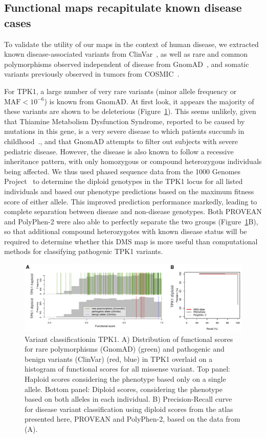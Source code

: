 \subsection{Functional maps recapitulate known disease cases}

To validate the utility of our maps in the context of human disease, we extracted known disease-associated variants from ClinVar~\cite{landrum_clinvar:_2016}, as well as rare and common polymorphisms observed independent of disease from GnomAD~\cite{lek_analysis_2016}, and somatic variants previously observed in tumors from COSMIC~\cite{forbes_cosmic:_2001}. 

For TPK1, a large number of very rare variants (minor allele frequency or $\text{MAF} < 10^{-6}$) is known from GnomAD. At first look, it appears the majority of these variants are shown to be deleterious (Figure~\ref{fig:tpk1_diploid}). This seems unlikely, given that Thiamine Metabolism Dysfunction Syndrome, reported to be caused by mutations in this gene, is a very severe disease to which patients succumb in childhood~\cite{mayr_thiamine_2011}., and that GnomAD attempts to filter out subjects with severe pediatric disease. However, the disease is also known to follow a recessive inheritance pattern, with only homozygous or compound heterozygous individuals being affected. We thus used phased sequence data from the 1000 Genomes Project~\cite{the_1000_genomes_project_consortium_global_2015} to determine the diploid genotypes in the TPK1 locus for all listed individuals and based our phenotype predictions based on the maximum fitness score of either allele. This improved prediction performance markedly, leading to complete separation between disease and non-disease genotypes. Both PROVEAN and PolyPhen-2 were also able to perfectly separate the two groups (Figure~\ref{fig:tpk1_diploid}B), so that additional compound heterozygotes with known disease status will be required to determine whether this DMS map is more useful than computational methods for classifying pathogenic TPK1 variants. 

\begin{figure}[h!]
	\centering
	\includegraphics[width=\textwidth]{img/diploid.pdf}
	\caption{Variant classificationin TPK1. A) Distribution of functional scores for rare polymorphisms (GnomAD) (green) and pathogenic and benign variants (ClinVar) (red, blue) in TPK1 overlaid on a histogram of functional scores for all missense variant. Top panel: Haploid scores considering the phenotype based only on a single allele. Bottom panel: Diploid scores, considering the phenotype based on both alleles in each individual. B) Precision-Recall curve for disease variant classification using diploid scores from the atlas presented here, PROVEAN and PolyPhen-2, based on the data from (A).}
	\label{fig:tpk1_diploid}
\end{figure}


